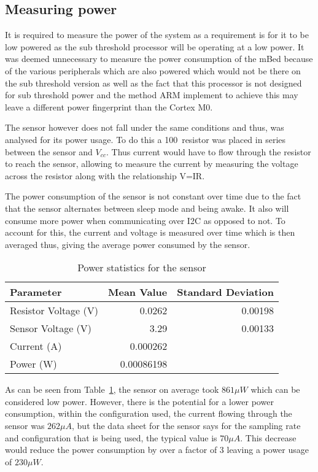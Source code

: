 \subsection{Measuring power}

It is required to measure the power of the system as a requirement is for it to be low powered as the sub threshold processor will be operating at a low power. It was deemed unnecessary to measure the power consumption of the mBed because of the various peripherals which are also powered which would not be there on the sub threshold version as well as the fact that this processor is not designed for sub threshold power and the method ARM implement to achieve this may leave a different power fingerprint than the Cortex M0. 

The sensor however does not fall under the same conditions and thus, was analysed for its power usage. To do this a 100\ohm ~resistor was placed in series between the sensor and $V_{cc}$. Thus current would have to flow through the resistor to reach the sensor, allowing to measure the current by measuring the voltage across the resistor along with the relationship V=IR.

The power consumption of the sensor is not constant over time due to the fact that the sensor alternates between sleep mode and being awake. It also will consume more power when communicating over I2C as opposed to not. To account for this, the current and voltage is measured over time which is then averaged thus, giving the average power consumed by the sensor.

\begin{table}
	\centering
	\begin{tabular}{|l|r|r|}
		\hline
		Parameter & Mean Value & Standard Deviation \\
		\hline
		Resistor Voltage (V) & 0.0262 & 0.00198 \\
		Sensor Voltage (V) & 3.29 & 0.00133 \\
		Current (A) & 0.000262 & \\
		Power (W) & 0.00086198 & \\
		\hline
	\end{tabular}
	\caption{Power statistics for the sensor}
	\label{tab:power}
\end{table}

As can be seen from Table~\ref{tab:power}, the sensor on average took $861\mu W$ which can be considered low power. However, there is the potential for a lower power consumption, within the configuration used, the current flowing through the sensor was $262\mu A$, but the data sheet for the sensor says for the sampling rate and configuration that is being used, the typical value is $70\mu A$. This decrease would reduce the power consumption by over a factor of 3 leaving a power usage of $230\mu W$.

